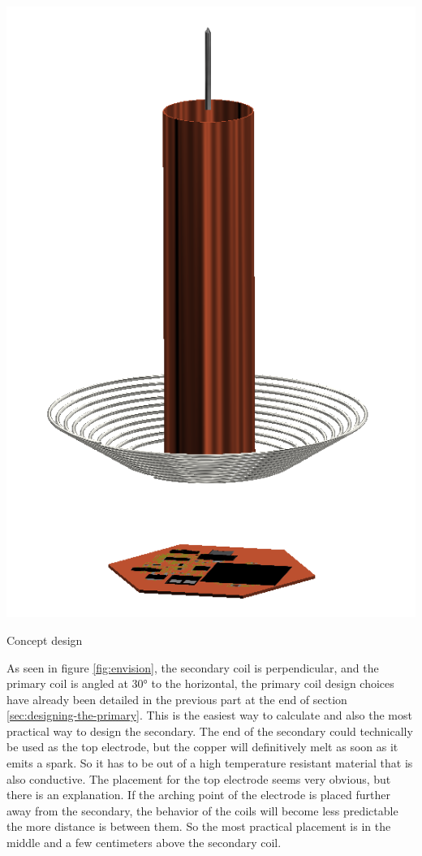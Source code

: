 \begin{marginfigure}[1cm]
    \centering
    \includegraphics[width=1.2\textwidth]{kassandra/resources/JerJerWoBistDuKonzept.PNG}
    \caption{Concept design}
    \label{fig:envision}
\end{marginfigure}

As seen in figure \ref{fig:envision}, the secondary coil is perpendicular, and the primary coil is angled at 30° to the horizontal, the primary coil design choices have already been detailed in the previous part at the end of section \ref{sec:designing-the-primary}. This is the easiest way to calculate and also the most practical way to design the secondary. The end of the secondary could technically be used as the top electrode, but the copper will definitively melt as soon as it emits a spark. So it has to be out of a high temperature resistant material that is also conductive. The placement for the top electrode seems very obvious, but there is an explanation. If the arching point of the electrode is placed further away from the secondary, the behavior of the coils will become less predictable the more distance is between them. So the most practical placement is in the middle and a few centimeters above the secondary coil.

